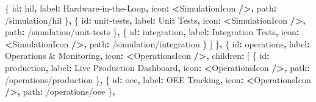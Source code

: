 \documentclass[
]{article}
\newenvironment{Shaded}{\begin{snugshade}}{\end{snugshade}}
\newcommand{\NormalTok}[1]{#1}
\newcommand{\OperatorTok}[1]{\textcolor[rgb]{0.81,0.36,0.00}{\textbf{#1}}}
\newcommand{\StringTok}[1]{\textcolor[rgb]{0.31,0.60,0.02}{#1}}
\begin{document}
\begin{Shaded}
\begin{Highlighting}[]
\NormalTok{      \{ id}\OperatorTok{:} \StringTok{\textquotesingle{}hil\textquotesingle{}}\OperatorTok{,}\NormalTok{ label}\OperatorTok{:} \StringTok{\textquotesingle{}Hardware{-}in{-}the{-}Loop\textquotesingle{}}\OperatorTok{,}\NormalTok{ icon}\OperatorTok{:} \OperatorTok{\textless{}}\NormalTok{SimulationIcon }\OperatorTok{/\textgreater{},}\NormalTok{ path}\OperatorTok{:} \StringTok{\textquotesingle{}/simulation/hil\textquotesingle{}}\NormalTok{ \}}\OperatorTok{,}
\NormalTok{      \{ id}\OperatorTok{:} \StringTok{\textquotesingle{}unit{-}tests\textquotesingle{}}\OperatorTok{,}\NormalTok{ label}\OperatorTok{:} \StringTok{\textquotesingle{}Unit Tests\textquotesingle{}}\OperatorTok{,}\NormalTok{ icon}\OperatorTok{:} \OperatorTok{\textless{}}\NormalTok{SimulationIcon }\OperatorTok{/\textgreater{},}\NormalTok{ path}\OperatorTok{:} \StringTok{\textquotesingle{}/simulation/unit{-}tests\textquotesingle{}}\NormalTok{ \}}\OperatorTok{,}
\NormalTok{      \{ id}\OperatorTok{:} \StringTok{\textquotesingle{}integration\textquotesingle{}}\OperatorTok{,}\NormalTok{ label}\OperatorTok{:} \StringTok{\textquotesingle{}Integration Tests\textquotesingle{}}\OperatorTok{,}\NormalTok{ icon}\OperatorTok{:} \OperatorTok{\textless{}}\NormalTok{SimulationIcon }\OperatorTok{/\textgreater{},}\NormalTok{ path}\OperatorTok{:} \StringTok{\textquotesingle{}/simulation/integration\textquotesingle{}}\NormalTok{ \}}
\NormalTok{    ]}
\NormalTok{  \}}\OperatorTok{,}
\NormalTok{  \{}
\NormalTok{    id}\OperatorTok{:} \StringTok{\textquotesingle{}operations\textquotesingle{}}\OperatorTok{,}
\NormalTok{    label}\OperatorTok{:} \StringTok{\textquotesingle{}Operations \& Monitoring\textquotesingle{}}\OperatorTok{,}
\NormalTok{    icon}\OperatorTok{:} \OperatorTok{\textless{}}\NormalTok{OperationsIcon }\OperatorTok{/\textgreater{},}
\NormalTok{    children}\OperatorTok{:}\NormalTok{ [}
\NormalTok{      \{ id}\OperatorTok{:} \StringTok{\textquotesingle{}production\textquotesingle{}}\OperatorTok{,}\NormalTok{ label}\OperatorTok{:} \StringTok{\textquotesingle{}Live Production Dashboard\textquotesingle{}}\OperatorTok{,}\NormalTok{ icon}\OperatorTok{:} \OperatorTok{\textless{}}\NormalTok{OperationsIcon }\OperatorTok{/\textgreater{},}\NormalTok{ path}\OperatorTok{:} \StringTok{\textquotesingle{}/operations/production\textquotesingle{}}\NormalTok{ \}}\OperatorTok{,}
\NormalTok{      \{ id}\OperatorTok{:} \StringTok{\textquotesingle{}oee\textquotesingle{}}\OperatorTok{,}\NormalTok{ label}\OperatorTok{:} \StringTok{\textquotesingle{}OEE Tracking\textquotesingle{}}\OperatorTok{,}\NormalTok{ icon}\OperatorTok{:} \OperatorTok{\textless{}}\NormalTok{OperationsIcon }\OperatorTok{/\textgreater{},}\NormalTok{ path}\OperatorTok{:} \StringTok{\textquotesingle{}/operations/oee\textquotesingle{}}\NormalTok{ \}}\OperatorTok{,}

\end{Highlighting}
\end{Shaded}
\end{document}

